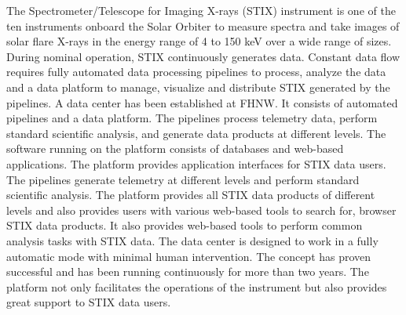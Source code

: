 \documentclass[referee]{aa} %
\begin{document}
  \abstract
   {The Spectrometer/Telescope for Imaging X-rays (STIX) instrument is one 
   of the ten instruments onboard the Solar Orbiter to measure spectra and take images of solar flare X-rays in the energy range of 4 to 150 keV over a wide range of sizes.} %
   {During nominal operation, STIX continuously generates data. Constant data flow requires fully automated data processing pipelines to process,
     analyze the data and a data platform to manage, 
   visualize and distribute STIX generated by the pipelines.   
   }
   {
   A data center has been established at FHNW. 
   It consists of automated pipelines and a data platform.
   The pipelines process telemetry data, perform standard scientific analysis, 
    and generate data products at different levels.  
   The software running on the platform 
   consists of databases and web-based applications. The platform provides application interfaces for STIX data users.  
   The pipelines generate telemetry at different levels and perform standard scientific analysis. 
   }
   {
 The platform provides  all STIX data products of different levels and also provides users 
 with various web-based tools to search for,  browser STIX data products. 
 It also provides web-based tools to perform common analysis tasks with STIX data. 
  The data center is designed to work in a fully automatic mode with minimal human intervention. The concept has proven successful 
 and has been running continuously for more than two years. The platform not only facilitates the operations of the instrument but also provides great support to STIX data users.}
 

   \maketitle

\end{document}
